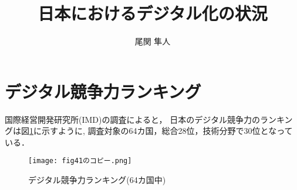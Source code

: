 \documentclass[a4paper,11pt,dvipdfmx]{ujarticle}
\title{日本におけるデジタル化の状況}
\author{尾関 隼人}
\begin{document}
\maketitle %

\section{デジタル競争力ランキング}
国際経営開発研究所(IMD)の調査\cite{imd}によると，
日本のデジタル競争力のランキングは図\ref{fig:ランキング}に示すように,
調査対象の64カ国，総合28位，技術分野で30位となっている．

\begin{figure}[htbp]
    \centering
    \texttt{[image: fig41のコピー.png]}
    \caption{デジタル競争力ランキング(64カ国中)}\label{fig:ランキング}
\end{figure}

\end{document}
